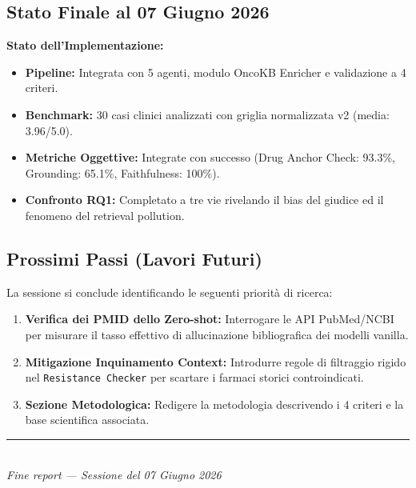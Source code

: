 \documentclass[12pt, a4paper]{article}
\begin{document}
\subsection{Stato Finale al 07 Giugno 2026}
\begin{summarybox}
\textbf{Stato dell'Implementazione:}
\begin{itemize}[leftmargin=1.1em, itemsep=2pt]
  \item \textbf{Pipeline:} Integrata con 5 agenti, modulo OncoKB Enricher e validazione a 4 criteri.
  \item \textbf{Benchmark:} 30 casi clinici analizzati con griglia normalizzata v2 (media: 3.96/5.0).
  \item \textbf{Metriche Oggettive:} Integrate con successo (Drug Anchor Check: 93.3\%, Grounding: 65.1\%, Faithfulness: 100\%).
  \item \textbf{Confronto RQ1:} Completato a tre vie rivelando il bias del giudice ed il fenomeno del retrieval pollution.
\end{itemize}
\end{summarybox}

\subsection{Prossimi Passi (Lavori Futuri)}
La sessione si conclude identificando le seguenti priorità di ricerca:
\begin{enumerate}[leftmargin=1.6em, itemsep=3pt]
  \item \textbf{Verifica dei PMID dello Zero-shot:} Interrogare le API PubMed/NCBI per misurare il tasso effettivo di allucinazione bibliografica dei modelli vanilla.
  \item \textbf{Mitigazione Inquinamento Context:} Introdurre regole di filtraggio rigido nel \texttt{Resistance Checker} per scartare i farmaci storici controindicati.
  \item \textbf{Sezione Metodologica:} Redigere la metodologia descrivendo i 4 criteri e la base scientifica associata.
\end{enumerate}

\vfill
\begin{center}
  {\color{medgray}\rule{0.5\linewidth}{0.4pt}}\\[0.3em]
  {\small\color{medgray}\textit{Fine report --- Sessione del 07 Giugno 2026}}
\end{center}
\end{document}
